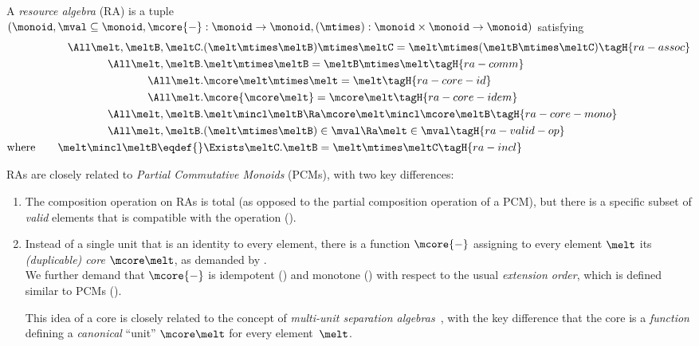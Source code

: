 \begin{defn}
  A \emph{resource algebra} (RA) is a tuple \\
  $(\monoid, \mval \subseteq \monoid, \mcore{-}:
  \monoid \to \monoid, (\mtimes) : \monoid \times \monoid \to \monoid)$ satisfying
  \begin{align*}
    \All \melt, \meltB, \meltC.& (\melt \mtimes \meltB) \mtimes \meltC = \melt \mtimes (\meltB \mtimes \meltC) \tagH{ra-assoc} \\
    \All \melt, \meltB.& \melt \mtimes \meltB = \meltB \mtimes \melt \tagH{ra-comm} \\
    \All \melt.& \mcore\melt \mtimes \melt = \melt \tagH{ra-core-id} \\
    \All \melt.& \mcore{\mcore\melt} = \mcore\melt \tagH{ra-core-idem} \\
    \All \melt, \meltB.& \melt \mincl \meltB \Ra \mcore\melt \mincl \mcore\meltB \tagH{ra-core-mono} \\
    \All \melt, \meltB.& (\melt \mtimes \meltB) \in \mval \Ra \melt \in \mval \tagH{ra-valid-op} \\
    \text{where}\qquad %
    \melt \mincl \meltB \eqdef{}& \Exists \meltC. \meltB = \melt \mtimes \meltC \tagH{ra-incl}
  \end{align*}
\end{defn}
\noindent
RAs are closely related to \emph{Partial Commutative Monoids} (PCMs), with two key differences:
\begin{enumerate}
\item The composition operation on RAs is total (as opposed to the partial composition operation of a PCM), but there is a specific subset of \emph{valid} elements that is compatible with the operation ().
\item Instead of a single unit that is an identity to every element, there is a function $\mcore{-}$ assigning to every element $\melt$ its \emph{(duplicable) core} $\mcore\melt$, as demanded by . \\
  We further demand that $\mcore{-}$ is idempotent () and monotone () with respect to the usual \emph{extension order}, which is defined similar to PCMs ().

  This idea of a core is closely related to the concept of \emph{multi-unit separation algebras}~\cite{Dockins+:aplas09}, with the key difference that the core is a \emph{function} defining a \emph{canonical} ``unit'' $\mcore\melt$ for every element~$\melt$.
\end{enumerate}



